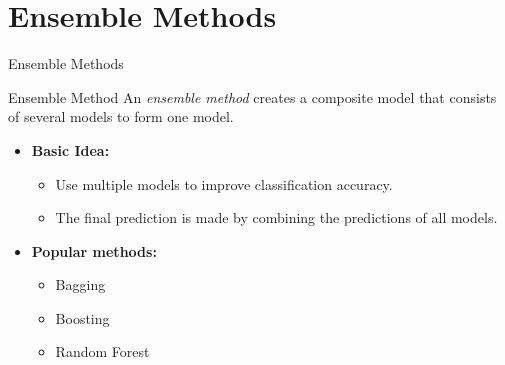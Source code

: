 \section{Ensemble Methods}

\begin{frame}{Ensemble Methods}
	\begin{block}{Ensemble Method}
		An \textit{ensemble method} creates a composite model that consists of several models to form one model.
	\end{block}
	\begin{itemize}
		\item \textbf{Basic Idea:}
		      \begin{itemize}
			      \item Use multiple models to improve classification accuracy.
			      \item The final prediction is made by combining the predictions of all models.
		      \end{itemize}
		\item \textbf{Popular methods:}
		      \begin{itemize}
			      \item Bagging
			      \item Boosting
			      \item Random Forest
		      \end{itemize}
	\end{itemize}
\end{frame}


